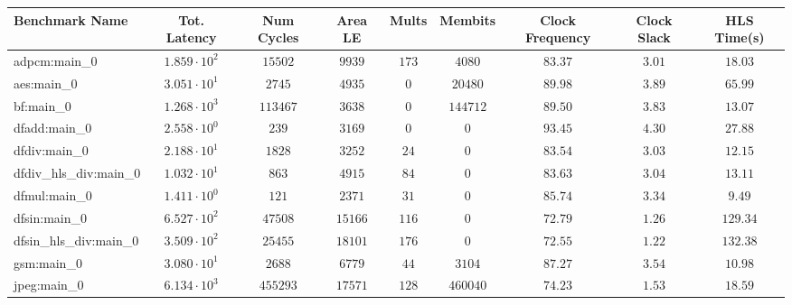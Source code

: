 \begin{tabular}{|l|c|c|c|c|c|c|c|c|}
\hline
Benchmark Name          & Tot. Latency           & Num Cycles & Area LE   & Mults   & Membits    & Clock Frequency & Clock Slack & HLS Time(s) \\
\hline
adpcm:main\_0           & $ 1.859 \cdot 10^{2} $ & $ 15502  $ & $ 9939  $ & $ 173 $ & $ 4080   $ & $ 83.37       $ & $ 3.01    $ & $ 18.03   $ \\
aes:main\_0             & $ 3.051 \cdot 10^{1} $ & $ 2745   $ & $ 4935  $ & $ 0   $ & $ 20480  $ & $ 89.98       $ & $ 3.89    $ & $ 65.99   $ \\
bf:main\_0              & $ 1.268 \cdot 10^{3} $ & $ 113467 $ & $ 3638  $ & $ 0   $ & $ 144712 $ & $ 89.50       $ & $ 3.83    $ & $ 13.07   $ \\
dfadd:main\_0           & $ 2.558 \cdot 10^{0} $ & $ 239    $ & $ 3169  $ & $ 0   $ & $ 0      $ & $ 93.45       $ & $ 4.30    $ & $ 27.88   $ \\
dfdiv:main\_0           & $ 2.188 \cdot 10^{1} $ & $ 1828   $ & $ 3252  $ & $ 24  $ & $ 0      $ & $ 83.54       $ & $ 3.03    $ & $ 12.15   $ \\
dfdiv\_hls\_div:main\_0 & $ 1.032 \cdot 10^{1} $ & $ 863    $ & $ 4915  $ & $ 84  $ & $ 0      $ & $ 83.63       $ & $ 3.04    $ & $ 13.11   $ \\
dfmul:main\_0           & $ 1.411 \cdot 10^{0} $ & $ 121    $ & $ 2371  $ & $ 31  $ & $ 0      $ & $ 85.74       $ & $ 3.34    $ & $ 9.49    $ \\
dfsin:main\_0           & $ 6.527 \cdot 10^{2} $ & $ 47508  $ & $ 15166 $ & $ 116 $ & $ 0      $ & $ 72.79       $ & $ 1.26    $ & $ 129.34  $ \\
dfsin\_hls\_div:main\_0 & $ 3.509 \cdot 10^{2} $ & $ 25455  $ & $ 18101 $ & $ 176 $ & $ 0      $ & $ 72.55       $ & $ 1.22    $ & $ 132.38  $ \\
gsm:main\_0             & $ 3.080 \cdot 10^{1} $ & $ 2688   $ & $ 6779  $ & $ 44  $ & $ 3104   $ & $ 87.27       $ & $ 3.54    $ & $ 10.98   $ \\
jpeg:main\_0            & $ 6.134 \cdot 10^{3} $ & $ 455293 $ & $ 17571 $ & $ 128 $ & $ 460040 $ & $ 74.23       $ & $ 1.53    $ & $ 18.59   $ \\

\end{tabular}
